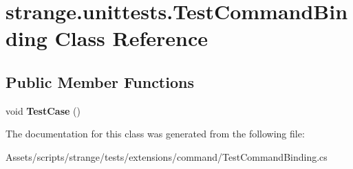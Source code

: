 \hypertarget{classstrange_1_1unittests_1_1_test_command_binding}{\section{strange.\-unittests.\-Test\-Command\-Binding Class Reference}
\label{classstrange_1_1unittests_1_1_test_command_binding}
}
\subsection*{Public Member Functions}
\begin{DoxyCompactItemize}
\item 
\hypertarget{classstrange_1_1unittests_1_1_test_command_binding_a6347d3d20c0a421b6cde213feec7f188}{void {\bfseries Test\-Case} ()}\label{classstrange_1_1unittests_1_1_test_command_binding_a6347d3d20c0a421b6cde213feec7f188}

\end{DoxyCompactItemize}


The documentation for this class was generated from the following file\-:\begin{DoxyCompactItemize}
\item 
Assets/scripts/strange/tests/extensions/command/Test\-Command\-Binding.\-cs\end{DoxyCompactItemize}
